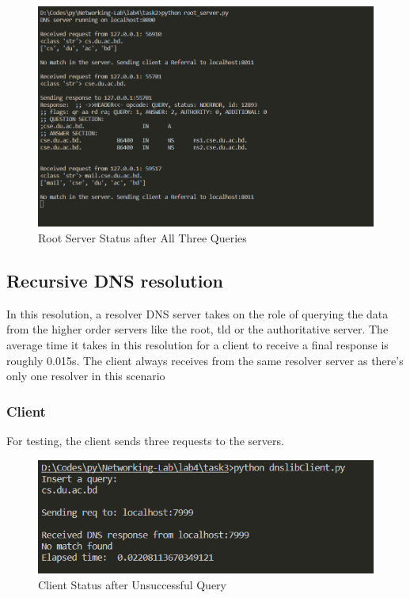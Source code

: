 \documentclass[11pt]{article}
\begin{document}
\begin{itemize}
                    \begin{figure}[!h]
                        \centering
                        \includegraphics*[width=\textwidth]{task2_server_root.png}
                        \caption{Root Server Status after All Three Queries}
                    \end{figure}
                \FloatBarrier
            \end{itemize}

            \FloatBarrier

\newpage
    \subsection{Recursive DNS resolution}
    In this resolution, a resolver DNS server takes on the role of querying the data from the higher order servers like the root, tld or the authoritative server.
    The average time it takes in this resolution for a client to receive a final response is roughly 0.015s.
    The client always receives from the same resolver server as there's only one resolver in this scenario
        \subsubsection*{Client}
        For testing, the client sends three requests to the servers.
        \begin{figure}[!h]
            \centering
            \includegraphics*[width=\textwidth]{task3_client_unsuccessful.png}
            \caption{Client Status after Unsuccessful Query}
        \end{figure}
        \FloatBarrier
        
\end{document}
